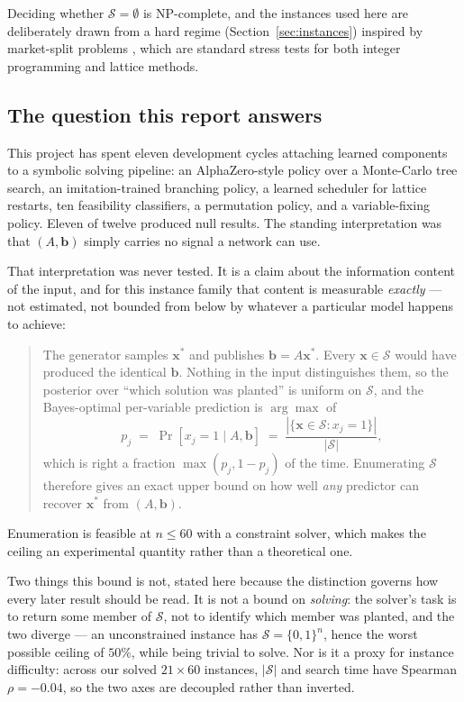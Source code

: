 \documentclass[12pt]{article}
\begin{document}
Deciding whether $\mathcal{S}=\emptyset$ is NP-complete, and the instances used here are deliberately drawn from a hard regime (Section~\ref{sec:instances}) inspired by market-split problems \citep{cornuejols1999market, aardal2000market}, which are standard stress tests for both integer programming and lattice methods.

\subsection{The question this report answers}

This project has spent eleven development cycles attaching learned components to a symbolic solving pipeline: an AlphaZero-style policy over a Monte-Carlo tree search, an imitation-trained branching policy, a learned scheduler for lattice restarts, ten feasibility classifiers, a permutation policy, and a variable-fixing policy. Eleven of twelve produced null results. The standing interpretation was that $(A,\mathbf{b})$ simply carries no signal a network can use.

That interpretation was never tested. It is a claim about the information content of the input, and for this instance family that content is measurable \emph{exactly} --- not estimated, not bounded from below by whatever a particular model happens to achieve:

\begin{quote}
The generator samples $\mathbf{x}^\ast$ and publishes $\mathbf{b}=A\mathbf{x}^\ast$. Every $\mathbf{x}\in\mathcal{S}$ would have produced the identical $\mathbf{b}$. Nothing in the input distinguishes them, so the posterior over ``which solution was planted'' is uniform on $\mathcal{S}$, and the Bayes-optimal per-variable prediction is $\arg\max$ of
\begin{equation}
p_j \;=\; \Pr[x_j=1 \mid A,\mathbf{b}] \;=\; \frac{|\{\mathbf{x}\in\mathcal{S}: x_j=1\}|}{|\mathcal{S}|},
\label{eq:marginal}
\end{equation}
which is right a fraction $\max(p_j,1-p_j)$ of the time. Enumerating $\mathcal{S}$ therefore gives an exact upper bound on how well \emph{any} predictor can recover $\mathbf{x}^\ast$ from $(A,\mathbf{b})$.
\end{quote}

Enumeration is feasible at $n\le 60$ with a constraint solver, which makes the ceiling an experimental quantity rather than a theoretical one.

Two things this bound is not, stated here because the distinction governs how every later result should be read. It is not a bound on \emph{solving}: the solver's task is to return some member of $\mathcal{S}$, not to identify which member was planted, and the two diverge --- an unconstrained instance has $\mathcal{S}=\{0,1\}^n$, hence the worst possible ceiling of $50\%$, while being trivial to solve. Nor is it a proxy for instance difficulty: across our solved $21\times60$ instances, $|\mathcal{S}|$ and search time have Spearman $\rho=-0.04$, so the two axes are decoupled rather than inverted.
\end{document}
